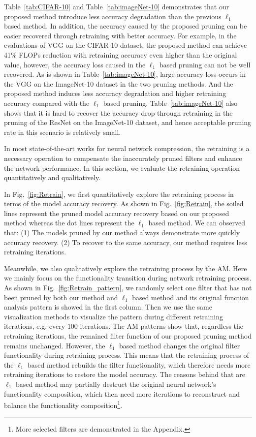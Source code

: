 \documentclass{article} %
\begin{document}
Table~\ref{tab:CIFAR-10} and Table~\ref{tab:imageNet-10} demonstrates that our proposed method introduce less accuracy degradation than the previous $\ell_1$ based method.
In addition, the accuracy caused by the proposed pruning can be easier recovered through retraining with better accuracy.
For example, in the evaluations of VGG on the CIFAR-10 dataset, the proposed method can achieve 41\% FLOPs reduction with retraining accuracy even higher than the original value, however, the accuracy loss caused in the $\ell_1$ based pruning can not be well recovered.
As is shown in Table~\ref{tab:imageNet-10}, large accuracy loss occurs in the VGG on the ImageNet-10 dataset in the two pruning methods.
And the proposed method induces less accuracy degradation and higher retraining accuracy compared with the $\ell_1$ based pruning.
Table~\ref{tab:imageNet-10} also shows that it is hard to recover the accuracy drop through retraining in the pruning of the ResNet on the ImageNet-10 dataset, and hence acceptable pruning rate in this scenario is relatively small.

In most state-of-the-art works for neural network compression, the retraining is a necessary operation to compensate the inaccurately pruned filters and enhance the network performance.
In this section, we evaluate the retraining operation quantitatively and qualitatively.

In Fig.~\ref{fig:Retrain}, we first quantitatively explore the retraining process in terms of the model accuracy recovery.
  As shown in Fig.~\ref{fig:Retrain}, the soiled lines represent the pruned model accuracy recovery based on our proposed method whereas the dot lines represent the $\ell_1$ based method.
  We can observed that:
  (1) The models pruned by our method always demonstrate more quickly accuracy recovery.
  (2) To recover to the same accuracy, our method requires less retraining iterations.

Meanwhile, we also qualitatively explore the retraining process by the AM. Here we mainly focus on the functionality transition during network retraining process.
  As shown in Fig.~\ref{fig:Retrain_pattern}, we randomly select one filter that has not been pruned by both our method and $\ell_1$ based method and its original function analysis pattern is showed in the first column.
  Then we use the same visualization methods to visualize the pattern during different retraining iterations, e.g. every $100$ iterations.
  The AM patterns show that, regardless the retraining iterations, the remained filter function of our proposed pruning method remains unchanged.
  However, the $\ell_1$ based method changes the original filter functionality during retraining process. This means that the retraining process of the $\ell_1$ based method rebuilds the filter functionality, which therefore needs more retraining iterations to restore the model accuracy. The reasons behind that are $\ell_1$ based method may partially destruct the original neural network's functionality composition, which then need more iterations to reconstruct and balance the functionality composition\footnote{More selected filters are demonstrated in the Appendix.}.
\end{document}
